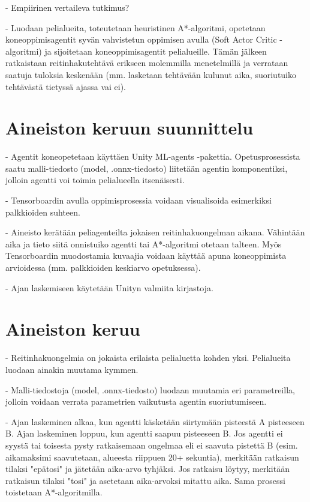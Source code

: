 \documentclass[utf8]{gradu3}
\begin{document}
- Empiirinen vertaileva tutkimus?

- Luodaan pelialueita, toteutetaan heuristinen A*-algoritmi, opetetaan koneoppimisagentit syvän vahvistetun oppimisen avulla (Soft Actor Critic -algoritmi)
ja sijoitetaan koneoppimisagentit pelialueille. Tämän jälkeen ratkaistaan reitinhakutehtävä erikseen molemmilla menetelmillä ja verrataan saatuja tuloksia keskenään
(mm. lasketaan tehtävään kulunut aika, suoriutuiko tehtävästä tietyssä ajassa vai ei).

\chapter{Aineiston keruun suunnittelu}

- Agentit koneopetetaan käyttäen Unity ML-agents -pakettia. Opetusprosessista saatu malli-tiedosto (model, .onnx-tiedosto) liitetään agentin
komponentiksi, jolloin agentti voi toimia pelialueella itsenäisesti.

- Tensorboardin avulla oppimisprosessia voidaan visualisoida esimerkiksi palkkioiden suhteen.

- Aineisto kerätään peliagenteilta jokaisen reitinhakuongelman aikana. Vähintään aika ja tieto siitä onnistuiko agentti tai A*-algoritmi otetaan talteen.
Myös Tensorboardin muodostamia kuvaajia voidaan käyttää apuna koneoppimista arvioidessa (mm. palkkioiden keskiarvo opetuksessa).

- Ajan laskemiseen käytetään Unityn valmiita kirjastoja.

\chapter{Aineiston keruu}

- Reitinhakuongelmia on jokaista erilaista pelialuetta kohden yksi. Pelialueita luodaan ainakin muutama kymmen.

- Malli-tiedostoja (model, .onnx-tiedosto) luodaan muutamia eri parametreilla, jolloin voidaan verrata parametrien vaikutusta agentin suoriutumiseen.

- Ajan laskeminen alkaa, kun agentti käsketään siirtymään pisteestä A pisteeseen B.
Ajan laskeminen loppuu, kun agentti saapuu pisteeseen B. Jos agentti ei syystä tai toisesta
pysty ratkaisemaan ongelmaa eli ei saavuta pistettä B (esim. aikamaksimi saavutetaan, alueesta riippuen 20+ sekuntia), merkitään ratkaisun tilaksi "epätosi"
ja jätetään aika-arvo tyhjäksi. Jos ratkaisu löytyy, merkitään ratkaisun tilaksi "tosi" ja
asetetaan aika-arvoksi mitattu aika. Sama prosessi toistetaan A*-algoritmilla.
\end{document}
